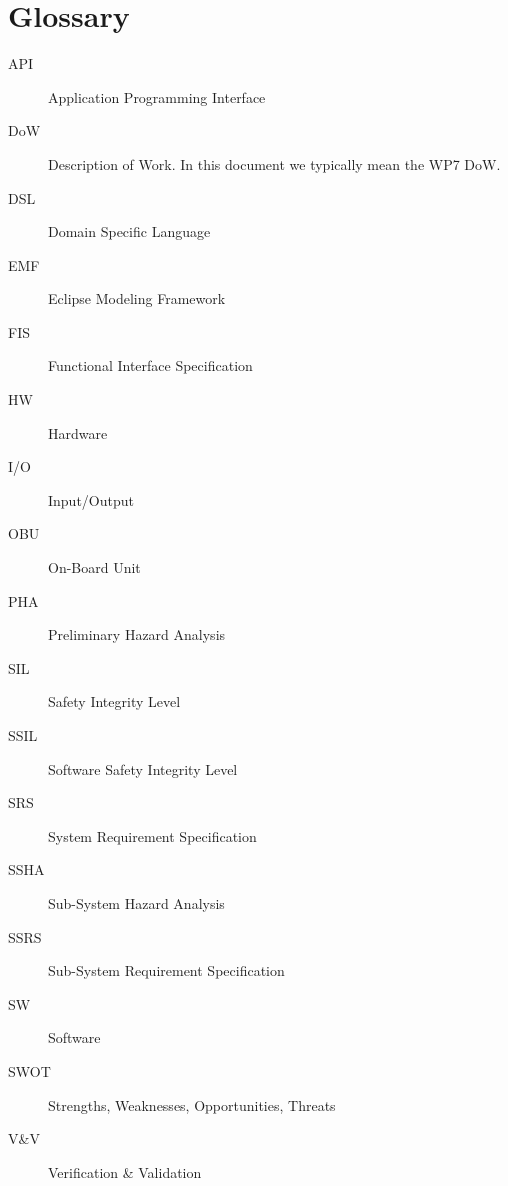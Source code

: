 




\section{Glossary}
\label{sec:glossary}

\begin{description}
\item[API] Application Programming Interface
\item[DoW] Description of Work.  In this document we typically mean the WP7 DoW.
\item[DSL] Domain Specific Language
\item[EMF] Eclipse Modeling Framework
\item[FIS] Functional Interface Specification
\item[HW] Hardware
\item[I/O] Input/Output
\item[OBU] On-Board Unit
\item[PHA] Preliminary Hazard Analysis
\item[SIL] Safety Integrity Level
\item[SSIL] Software Safety Integrity Level
\item[SRS] System Requirement Specification
\item[SSHA] Sub-System Hazard Analysis
\item[SSRS] Sub-System Requirement Specification
\item[SW] Software
\item[SWOT] Strengths, Weaknesses, Opportunities, Threats
\item[V\&V] Verification \& Validation
\end{description}



